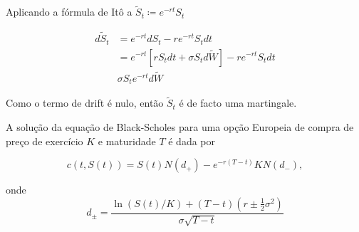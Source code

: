 \documentclass{article}
\begin{document}
Aplicando a fórmula de Itô a $\tilde{S}_t \coloneq e^{-rt}S_t$

\begin{align*}
    d\tilde{S}_t&=e^{-rt}dS_t-re^{-rt}S_tdt\\
                &=e^{-rt}[r S_tdt+ \sigma S_t d\tilde{W}]-re^{-rt}S_tdt\\
                &\sigma S_te^{-rt}d \tilde{W}
\end{align*}

Como o termo de drift é nulo, então $\tilde{S}_t$ é de facto uma martingale.

\vspace{2cm}

\begin{thm}
    A solução da equação de Black-Scholes para uma opção Europeia de compra de preço de exercício $K$ e maturidade $T$ é dada por

    $$c(t,S(t))=S(t)N(d_+)-e^{-r(T-t)}K N(d_-),$$

    onde $$d_{\pm}=\frac{\ln (S(t)/K)+(T-t)(r \pm \frac{1}{2}\sigma^2)}{\sigma  \sqrt{T-t}}$$
\end{thm}
\end{document}
